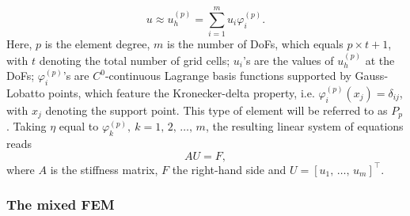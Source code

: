 \documentclass[review,3p]{elsarticle}
\begin{document}
\begin{equation}
 u \approx u_h ^{(p)} = \sum _ {i=1} ^{m} u _{i} \varphi _{i}^{(p)}. \label{sm_u_approx}%
\end{equation}
Here, $p$ is the element degree, $m$ is the number of DoFs, which equals $p \times t + 1$, with $t$ denoting the total number of grid cells; $u_i$'s are the values of $u_h^{(p)}$ at the DoFs; $\varphi _{i}^{(p)}$'s are $C^0$-continuous Lagrange basis functions supported by Gauss-Lobatto points, which feature the Kronecker-delta property, i.e. $\varphi _{i}^{(p)} (x_j)=\delta_{ij}$, with $x_j$ denoting the support point. This type of element will be referred to as $P_p$. Taking $\eta$ equal to $\varphi ^{(p)}_{k},~ k=1, \,2, \, \ldots , \, m$, the resulting linear system of equations reads
\begin{equation}
 A {U} = F,				\label{matrix_equation_std}
\end{equation}
where $A$ is the stiffness matrix, $F$ the right-hand side and $U=[u_1,\,\ldots,\,u_m]^\top$.

\subsubsection{The mixed FEM}
\end{document}
